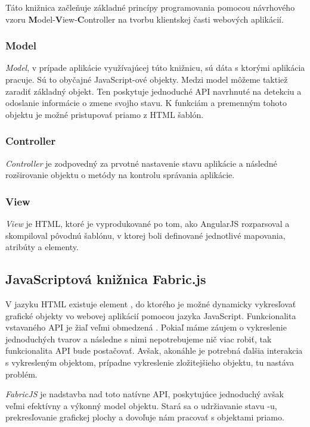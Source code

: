 Táto knižnica začleňuje základné princípy programovania pomocou návrhového vzoru \textbf{M}odel-\textbf{V}iew-\textbf{C}ontroller na tvorbu klientskej časti webových aplikácií.

\subsubsection{Model}
\textit{Model}, v prípade aplikácie využívajúcej túto knižnicu, sú dáta s ktorými aplikácia pracuje. Sú to obyčajné JavaScript-ové objekty. Medzi model môžeme taktiež zaradiť základný  objekt. Ten poskytuje jednoduché API navrhnuté na detekciu a odoslanie informácie o zmene svojho stavu. K funkciám a premenným tohoto objektu je možné pristupovať priamo z HTML šablón.

\subsubsection{Controller}
\textit{ Controller} je zodpovedný za prvotné nastavenie stavu aplikácie a následné rozširovanie  objektu o metódy na kontrolu správania aplikácie.

\subsubsection{View}
\textit{View} je HTML, ktoré je vyprodukované po tom, ako AngularJS rozparsoval a skompiloval pôvodnú šablónu, v ktorej boli definované jednotlivé mapovania, atribúty a elementy.

\subsection{JavaScriptová knižnica Fabric.js}
V jazyku HTML existuje element , do ktorého je možné dynamicky vykresľovať grafické objekty vo webovej aplikácií pomocou jazyka JavaScript. Funkcionalita vstavaného API je žiaľ veľmi obmedzená \cite{cabanier2014html}. Pokiaľ máme záujem o vykreslenie jednoduchých tvarov a následne s nimi nepotrebujeme nič viac robiť, tak funkcionalita API bude postačovať. Avšak, akonáhle je potrebná ďalšia interakcia s vykresleným objektom, prípadne vykreslenie zložitejšieho objektu, tu nastáva problém.

\textit{FabricJS} je nadstavba nad toto natívne API, poskytujúce jednoduchý avšak veľmi efektívny a výkonný model objektu. Stará sa o udržiavanie stavu -u, prekresľovanie grafickej plochy a dovoľuje nám pracovať s objektami priamo.

